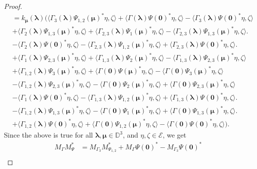\documentclass[12pt]{amsart}
\theoremstyle{definition}
\newcommand{\D}{\mathbb{D}}
\newcommand{\1}{{\mbox{\bf 1}}}
\newcommand{\cle}{\mathcal{E}}
\begin{document}
\begin{proof}
\begin{align*}
&= k_{\bm{{\mu}}}(\bm{\lambda}) \Big( \langle  \Gamma_3(\bm{\lambda}) \Psi_{1,2}(\bm{\mu})^* \eta,  \zeta \rangle + \langle  \Gamma(\bm{\lambda}) \Psi(\bm{0})^* \eta,  \zeta \rangle - \langle  \Gamma_3(\bm{\lambda}) \Psi(\bm{0})^* \eta,  \zeta \rangle \\
&+ \langle  \Gamma_2(\bm{\lambda})\Psi_{1,3}(\bm{\mu})^* \eta,  \zeta \rangle + \langle  \Gamma_{2,3}(\bm{\lambda}) \Psi_{1}(\bm{\mu})^* \eta,  \zeta \rangle - \langle \Gamma_{2,3}(\bm{\lambda}) \Psi_{1,3}(\bm{\mu})^* \eta,  \zeta \rangle. \\
&- \langle \Gamma_2(\bm{\lambda}) \Psi(\bm{0})^* \eta,  \zeta \rangle - \langle \Gamma_{2,3}(\bm{\lambda}) \Psi_{1,2}(\bm{\mu})^* \eta,  \zeta \rangle + \langle \Gamma_{2,3}(\bm{\lambda}) \Psi(\bm{0})^* \eta,  \zeta \rangle. \\
&+ \langle \Gamma_1(\bm{\lambda}) \Psi_{2,3}(\bm{\mu})^* \eta,  \zeta \rangle +  \langle \Gamma_{1,3}(\bm{\lambda}) \Psi_{2}(\bm{\mu})^* \eta,  \zeta \rangle - \langle \Gamma_{1,3}(\bm{\lambda}) \Psi_{2,3}(\bm{\mu})^* \eta,  \zeta \rangle \\
&+ \langle \Gamma_{1,2}(\bm{\lambda})\Psi_{3}(\bm{\mu})^* \eta,  \zeta \rangle + \langle \Gamma(\bm{0})\Psi(\bm{\mu})^* \eta,  \zeta \rangle - \langle \Gamma(\bm{0})  \Psi_{3}(\bm{\mu})^* \eta,  \zeta \rangle\\
&- \langle \Gamma_{1,2}(\bm{\lambda}) \Psi_{2,3}(\bm{\mu})^* \eta,  \zeta \rangle - \langle \Gamma(\bm{0}) \Psi_{2}(\bm{\mu})^* \eta,  \zeta \rangle + \langle \Gamma(\bm{0}) \Psi_{2,3}(\bm{\mu})^* \eta,  \zeta \rangle \\
&- \langle \Gamma_1(\bm{\lambda}) \Psi(\bm{0})^* \eta,  \zeta \rangle - \langle \Gamma_{1,3}(\bm{\lambda}) \Psi_{1,2}(\bm{\mu})^* \eta,  \zeta \rangle + \langle \Gamma_{1,3}(\bm{\lambda}) \Psi(\bm{0})^* \eta,  \zeta \rangle.\\
&- \langle \Gamma_{1,2}(\bm{\lambda})\Psi_{1,3}(\bm{\mu})^* \eta,  \zeta \rangle - \langle \Gamma (\bm{0}) \Psi_{1}(\bm{\mu})^* \eta,  \zeta \rangle + \langle \Gamma (\bm{0}) \Psi_{1,3}(\bm{\mu})^* \eta,  \zeta \rangle . \\
&+ \langle \Gamma_{1,2}(\bm{\lambda}) \Psi(\bm{0})^* \eta,  \zeta \rangle + \langle \Gamma(\bm{0}) \Psi_{1,2}(\bm{\mu})^* \eta,  \zeta \rangle - \langle \Gamma(\bm{0}) \Psi(\bm{0})^* \eta,  \zeta \rangle \Big).
\end{align*}
Since the above is true for all $\bm{\lambda}, \bm{\mu} \in \D^3$, and $\eta, \zeta \in \cle$, we get
\begin{align*}
M_{\Gamma}M_{\Psi}^*  &=  M_{\Gamma_3}M_{\Psi_{1,2}}^* + M_{\Gamma} \Psi(\bm{0})^* - M_{\Gamma_3} \Psi(\bm{0})^*\\

\end{align*}
\end{proof}
\end{document}
